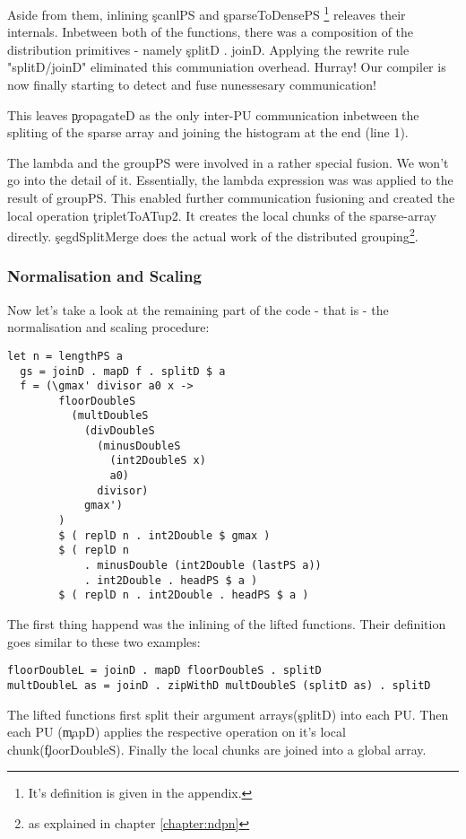       
      Aside from them, inlining \c{scanlPS} and \c{sparseToDensePS}
      \footnote{It's definition is given in the appendix.} releaves their internals.
      Inbetween both of the functions, there was a composition of the distribution primitives - namely \c{splitD . joinD}.
      Applying the rewrite rule "splitD/joinD" eliminated this communiation overhead. Hurray! Our compiler
      is now finally starting to detect and fuse nunessesary communication!
      
      This leaves \c{propagateD} as the only inter-PU communication inbetween the spliting of the
      sparse array and joining the histogram at the end (line 1).
      
      The lambda and the groupPS were involved in a rather special fusion. We won't
      go into the detail of it. Essentially, the lambda expression was
      was applied to the result of groupPS. This enabled further communication
      fusioning and created the local operation \c{tripletToATup2}. It creates the
      local chunks of the sparse-array directly. \c{segdSplitMerge} does the
      actual work of the distributed grouping\footnote{as explained in chapter \ref{chapter:ndpn}}.
      
    \subsubsection{Normalisation and Scaling}
    
    Now let's take a look at the remaining part of the code - that is - the
    normalisation and scaling procedure:
    
    \begin{lstlisting}
let n = lengthPS a
  gs = joinD . mapD f . splitD $ a
  f = (\gmax' divisor a0 x ->
        floorDoubleS
          (multDoubleS
            (divDoubleS
              (minusDoubleS
                (int2DoubleS x)
                a0)
              divisor)
            gmax')
        )
        $ ( replD n . int2Double $ gmax )
        $ ( replD n
            . minusDouble (int2Double (lastPS a))
            . int2Double . headPS $ a )
        $ ( replD n . int2Double . headPS $ a )
    \end{lstlisting}
    The first thing happend was the inlining of the lifted functions. Their definition goes similar to these two examples:
    \begin{lstlisting}
floorDoubleL = joinD . mapD floorDoubleS . splitD
multDoubleL as = joinD . zipWithD multDoubleS (splitD as) . splitD
    \end{lstlisting}
    The lifted functions first split their argument arrays(\c{splitD}) into each PU.
    Then each PU (\c{mapD}) applies the respective operation on it's local chunk(\c{floorDoubleS}).
    Finally the local chunks are joined into a global array.
    
